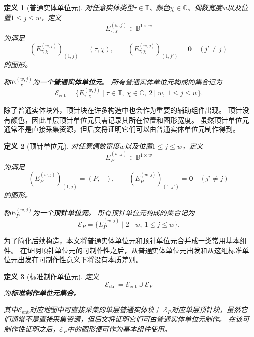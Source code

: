 \documentclass[UTF8,fontset=none]{ctexart}
\theoremstyle{cnthm}
\newtheorem{definition}{定义}[section]
\begin{document}
			\begin{definition}[普通实体单位元]
				对任意实体类型$\tau\in\mathbb{T}$、颜色$\chi\in\mathbb{C}$、偶数宽度$w$以及位置$1\leq j\leq w$，定义
				$$
				E_{\tau,\chi}^{(w,j)}\in\mathbb{B}^{1\times w}
				$$
				为满足
				$$
				\left(E_{\tau,\chi}^{(w,j)}\right)_{(1,j)}
				=
				(\tau,\chi),
				\qquad
				\left(E_{\tau,\chi}^{(w,j)}\right)_{(1,j')}
				=
				\mathbf{0}
				\quad(j'\neq j)
				$$
				的图形。
				
				称$E_{\tau,\chi}^{(w,j)}$为一个\textbf{普通实体单位元}。
				所有普通实体单位元构成的集合记为
				$$
				\mathcal{E}_{\mathrm{ent}}
				=
				\{E_{\tau,\chi}^{(w,j)}
				\mid
				\tau\in\mathbb{T},\ \chi\in\mathbb{C},\ 2\mid w,\ 1\leq j\leq w\}.
				$$
			\end{definition}
			
			除了普通实体块外，顶针块在许多构造中也会作为重要的辅助组件出现。
			顶针没有颜色，因此单层顶针单位元只需记录其所在位置和图形宽度。
			虽然顶针单位元通常不是直接采集资源，但后文将证明它们可以由普通实体单位元制作得到。
			
			\begin{definition}[顶针单位元]
				对任意偶数宽度$w$以及位置$1\leq j\leq w$，定义
				$$
				E_{P}^{(w,j)}\in\mathbb{B}^{1\times w}
				$$
				为满足
				$$
				\left(E_{P}^{(w,j)}\right)_{(1,j)}
				=
				(P,-),
				\qquad
				\left(E_{P}^{(w,j)}\right)_{(1,j')}
				=
				\mathbf{0}
				\quad(j'\neq j)
				$$
				的图形。
				
				称$E_{P}^{(w,j)}$为一个\textbf{顶针单位元}。
				所有顶针单位元构成的集合记为
				$$
				\mathcal{E}_{P}
				=
				\{E_{P}^{(w,j)}
				\mid
				2\mid w,\ 1\leq j\leq w\}.
				$$
			\end{definition}
			
			为了简化后续构造，本文将普通实体单位元和顶针单位元合并成一类常用基本组件。
			在证明顶针单位元的可制作性之后，从普通实体单位元出发和从这组标准单位元出发在可制作性意义下将没有本质差别。
			
			\begin{definition}[标准制作单位元]
				定义
				$$
				\mathcal{E}_{\mathrm{std}}
				=
				\mathcal{E}_{\mathrm{ent}}\cup\mathcal{E}_{P}
				$$
				为\textbf{标准制作单位元集合}。
				
				其中$\mathcal{E}_{\mathrm{ent}}$对应地图中可直接采集的单层普通实体块；
				$\mathcal{E}_{P}$对应单层顶针块，虽然它们通常不是直接采集资源，但后文将证明它们可由普通实体单位元制作。
				在该可制作性证明之后，$\mathcal{E}_{P}$中的图形便可作为基本组件使用。
			\end{definition}
			
\end{document}
